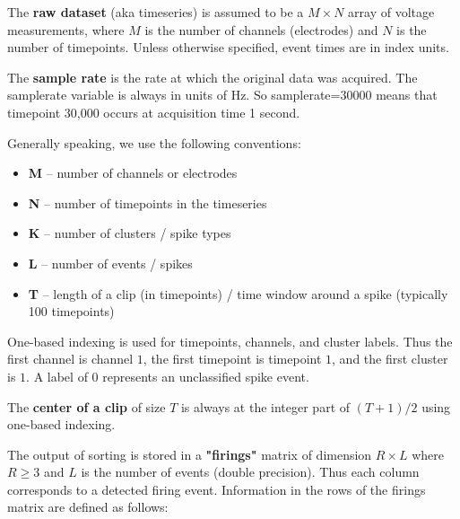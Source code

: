 \documentclass{article}
\begin{document}
The \textbf{raw dataset} (aka timeseries) is assumed to be a $M\times N$ array of voltage measurements, where $M$ is the number of channels (electrodes) and $N$ is the number of timepoints. Unless otherwise specified, event times are in index units.

The \textbf{sample rate} is the rate at which the original data was acquired. The samplerate variable is always in units of Hz. So samplerate=30000 means that timepoint 30,000 occurs at acquisition time 1 second.

Generally speaking, we use the following conventions:

\begin{itemize}
\item{\textbf{M} -- number of channels or electrodes}
\item{\textbf{N} -- number of timepoints in the timeseries}
\item{\textbf{K} -- number of clusters / spike types}
\item{\textbf{L} -- number of events / spikes}
\item{\textbf{T} -- length of a clip (in timepoints) / time window around a spike (typically 100 timepoints)}
\end{itemize}

One-based indexing is used for timepoints, channels, and cluster labels. Thus the first channel is channel $1$, the first timepoint is timepoint $1$, and the first cluster is $1$. A label of $0$ represents an unclassified spike event.

The \textbf{center of a clip} of size $T$ is always at the integer part of $(T+1)/2$ using one-based indexing.

The output of sorting is stored in a \textbf{"firings"} matrix of dimension $R\times L$ where $R\geq 3$ and $L$ is the number of events (double precision). Thus each column corresponds to a detected firing event. Information in the rows of the firings matrix are defined as follows:
\end{document}
